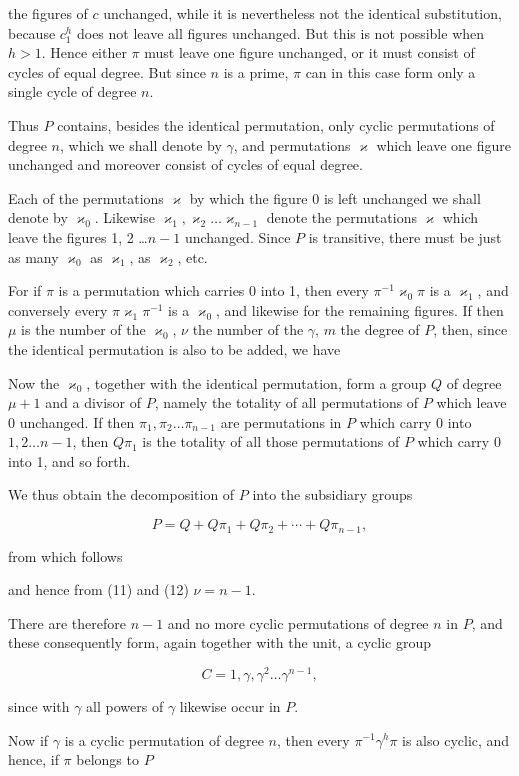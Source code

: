 the figures of $c$ unchanged, while it is nevertheless not the identical substitution, because $c_1^h$ does not leave all figures unchanged. But this is not possible when $h>1$. Hence either $\pi$ must leave one figure unchanged, or it must consist of cycles of equal degree. But since $n$ is a prime, $\pi$ can in this case form only a single cycle of degree $n$.

Thus $P$ contains, besides the identical permutation, only cyclic permutations of degree $n$, which we shall denote by $\gamma$, and permutations $\varkappa$ which leave one figure unchanged and moreover consist of cycles of equal degree.

Each of the permutations $\varkappa$ by which the figure 0 is left unchanged we shall denote by $\varkappa_0$. Likewise $\varkappa_1, \varkappa_2 \ldots \varkappa_{n-1}$ denote the permutations $\varkappa$ which leave the figures 1, 2 \ldots $n-1$ unchanged. Since $P$ is transitive, there must be just as many $\varkappa_0$ as $\varkappa_1$, as $\varkappa_2$, etc.

For if $\pi$ is a permutation which carries 0 into 1, then every $\pi^{-1}\varkappa_0\pi$ is a $\varkappa_1$, and conversely every $\pi\varkappa_1\pi^{-1}$ is a $\varkappa_0$, and likewise for the remaining figures. If then $\mu$ is the number of the $\varkappa_0$, $\nu$ the number of the $\gamma$, $m$ the degree of $P$, then, since the identical permutation is also to be added, we have


Now the $\varkappa_0$, together with the identical permutation, form a group $Q$ of degree $\mu+1$ and a divisor of $P$, namely the totality of all permutations of $P$ which leave 0 unchanged. If then $\pi_1, \pi_2 \ldots \pi_{n-1}$ are permutations in $P$ which carry 0 into $1, 2 \ldots n-1$, then $Q\pi_1$ is the totality of all those permutations of $P$ which carry 0 into 1, and so forth.

We thus obtain the decomposition of $P$ into the subsidiary groups

\[
P = Q + Q\pi_1 + Q\pi_2 + \cdots + Q\pi_{n-1},
\]

from which follows


and hence from (11) and (12) $\nu = n-1$.

There are therefore $n-1$ and no more cyclic permutations of degree $n$ in $P$, and these consequently form, again together with the unit, a cyclic group

\[
C = 1, \gamma, \gamma^2 \ldots \gamma^{n-1},
\]

since with $\gamma$ all powers of $\gamma$ likewise occur in $P$.

Now if $\gamma$ is a cyclic permutation of degree $n$, then every $\pi^{-1}\gamma^h\pi$ is also cyclic, and hence, if $\pi$ belongs to $P$

